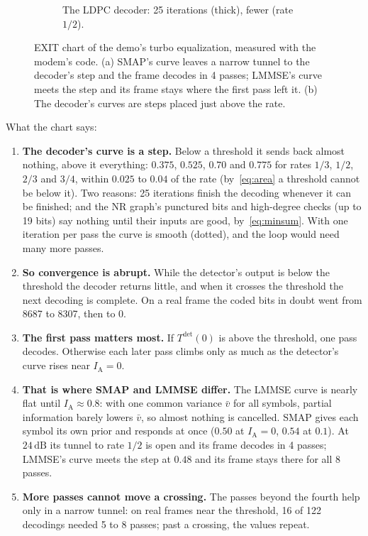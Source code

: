 \documentclass[11pt,a4paper]{article}
\newcommand{\dB}{\,\mathrm{dB}}
\newcommand{\IA}{I_{\mathrm{A}}}
\newcommand{\IE}{I_{\mathrm{E}}}
\theoremstyle{definition}
\theoremstyle{remark}
\begin{document}
\begin{figure}[htb]
\begin{subfigure}[t]{0.49\textwidth}
\caption{The LDPC decoder: 25 iterations (thick), fewer (rate $1/2$).}
\end{subfigure}
\caption{EXIT chart of the demo's turbo equalization, measured with the modem's code. (a) SMAP's curve leaves a narrow tunnel to the decoder's step and the frame decodes in 4 passes; LMMSE's curve meets the step and its frame stays where the first pass left it. (b) The decoder's curves are steps placed just above the rate.}
\label{fig:exit-modem}
\end{figure}

What the chart says:
\begin{enumerate}[leftmargin=*]
  \item \textbf{The decoder's curve is a step.} Below a threshold it sends back almost nothing, above it everything: $0.375$, $0.525$, $0.70$ and $0.775$ for rates $1/3$, $1/2$, $2/3$ and $3/4$, within $0.025$ to $0.04$ of the rate (by~\eqref{eq:area} a threshold cannot be below it). Two reasons: 25 iterations finish the decoding whenever it can be finished; and the NR graph's punctured bits and high-degree checks (up to 19 bits) say nothing until their inputs are good, by~\eqref{eq:minsum}. With one iteration per pass the curve is smooth (dotted), and the loop would need many more passes.
  \item \textbf{So convergence is abrupt.} While the detector's output is below the threshold the decoder returns little, and when it crosses the threshold the next decoding is complete. On a real frame the coded bits in doubt went from 8687 to 8307, then to 0.
  \item \textbf{The first pass matters most.} If $T^{\mathrm{det}}(0)$ is above the threshold, one pass decodes. Otherwise each later pass climbs only as much as the detector's curve rises near $\IA = 0$.
  \item \textbf{That is where SMAP and LMMSE differ.} The LMMSE curve is nearly flat until $\IA\approx 0.8$: with one common variance $\bar v$ for all symbols, partial information barely lowers $\bar v$, so almost nothing is cancelled. SMAP gives each symbol its own prior and responds at once ($0.50$ at $\IA=0$, $0.54$ at $0.1$). At $24\dB$ its tunnel to rate $1/2$ is open and its frame decodes in 4 passes; LMMSE's curve meets the step at $0.48$ and its frame stays there for all 8 passes.
  \item \textbf{More passes cannot move a crossing.} The passes beyond the fourth help only in a narrow tunnel: on real frames near the threshold, 16 of 122 decodings needed 5 to 8 passes; past a crossing, the values repeat.

\end{enumerate}
\end{document}
